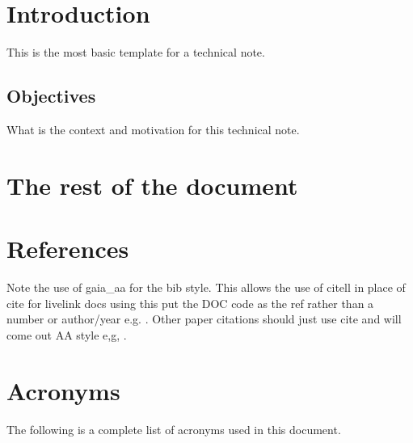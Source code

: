 \documentclass[DM,TN]{lsstdoc}
\begin{document}
\mkshorttitle

%


\section{Introduction \label{sect:intro}}
This is the most basic template for a technical note.

\subsection{Objectives \label{sect:objectives}}
What is the context and motivation for this technical note.

\section{The rest of the document \label{sect:sec1}}


\section{References\label{sect:refs}} 
\renewcommand{\refname}{}



Note the use of gaia\_aa for the bib style. This allows the use of citell in
place of cite for livelink docs using this put the DOC code as the ref
rather than a number or author/year e.g. . Other paper
citations should just use cite and will come out AA style e,g, \cite{2001ASPC..225..201O}.

\appendix

\section{Acronyms \label{sect:acronyms}}
The following is a complete list of acronyms used in this document.

\end{document}
